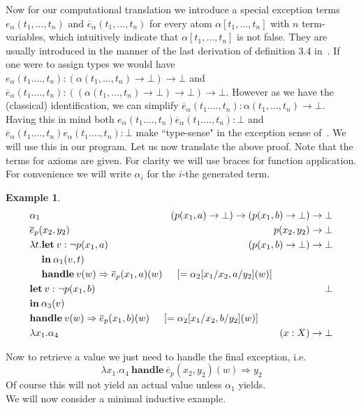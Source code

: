 \documentclass[onehalfspacing]{article}
\newtheorem{example}[theorem]{Example}
\begin{document}
Now for our computational translation we introduce a special exception terms $e_\alpha(t_1,\dots,t_n)$ and $\overline e_\alpha(t_1,\dots,t_n)$ for every atom $\alpha[t_1,\dots,t_n]$ with $n$ term-variables, which intuitively indicate that $\alpha[t_1,\dots,t_n]$ is not false. They are usually introduced in the manner of the last derivation of definition 3.4 in~\cite{de_Groote_1995}. If one were to assign types we would have $e_\alpha(t_1.\dots,t_n) : (\alpha(t_1,\dots,t_n)\to\bot)\to\bot$ and $\overline e_\alpha(t_1.\dots,t_n) : ((\alpha(t_1,\dots,t_n)\to\bot)\to\bot)\to\bot$. However as we have the (classical) identification, we can simplify $\overline e_\alpha(t_1.\dots,t_n) : \alpha(t_1,\dots,t_n)\to\bot$. Having this in mind both $e_\alpha(t_1.\dots,t_n) \overline e_\alpha(t_1.\dots,t_n) : \bot$ and $\overline e_\alpha(t_1.\dots,t_n) e_\alpha(t_1.\dots,t_n) : \bot$ make ``type-sense" in the exception sense of~\cite{de_Groote_1995}. We will use this in our program. Let us now translate the above proof. Note that the terms for axioms are given. For clarity we will use braces for function application. For convenience we will write $\alpha_i$ for the $i$-the generated term.
\setcounter{equation}{0}
\begin{example}\hfill
	\begin{align}
		& \alpha_1 & (p(x_1,a)\to\bot)\to(p(x_1, b)\to\bot)\to\bot\\
		& \overline e_p(x_2, y_2) & p(x_2, y_2)\to\bot\\
		& \lambda t. \mathbf{let}\:v : \neg p(x_1, a)&(p(x_1, b)\to\bot)\to\bot\\
		& \phantom{\lambda t.}\mathbf{in}\:\alpha_1(v, t) &\nonumber\\
		& \phantom{\lambda t.}\mathbf{handle}\:v(w)\Rightarrow \overline e_p(x_1, a)(w)\indent [= \alpha_2[x_1/x_2, a/y_2](w)]\hspace*{-4cm}\nonumber&\\
		& \mathbf{let}\:v : \neg p(x_1, b)\:&\bot\\
		& \mathbf{in}\:\alpha_3(v) &\nonumber\\
		& \mathbf{handle}\:v(w)\Rightarrow \overline e_p(x_1, b)(w)\indent[= \alpha_2[x_1/x_2, b/y_2](w)]\hspace*{-4cm}\nonumber&\\
		& \lambda x_1.\alpha_4 &(x : X) \to \bot
	\end{align}
\end{example}

Now to retrieve a value we just need to handle the final exception, i.e.
$$\lambda x_1.\alpha_4\:\mathbf{handle}\: \overline{e}_p(x_2, y_2)(w)\Rightarrow y_2$$
Of course this will not yield an actual value unless $\alpha_1$ yields.\\
We will now consider a minimal inductive example.\pagebreak
\end{document}
